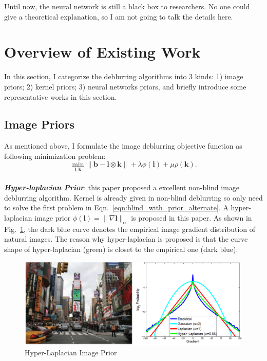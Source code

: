 \documentclass[journal, onecolumn, 10pt]{IEEEtran}
\begin{document}
Until now, the neural network is still a black box to researchers. No one could give a theoretical explanation, so I am not going to talk the details here.

\section{Overview of Existing Work}
In this section, I categorize the deblurring algorithms into $3$ kinds: 1) image priors; 2) kernel priors; 3) neural networks priors, and briefly introduce some representative works in this section.

\subsection{Image Priors}
\label{subsec:image_prior}
As mentioned above, I formulate the image deblurring objective function as following minimization problem:
\begin{equation}
\min_{\mathbf{l}, \mathbf{k}} \| \mathbf{b} - \mathbf{l} \otimes \mathbf{k} \| + \lambda\phi(\mathbf{l}) + \mu \rho(\mathbf{k}).
\label{eqn:objective_funtion}
\end{equation}
~\\
\textbf{\emph{Hyper-laplacian Prior}}\cite{krishnan2009fast}: this paper proposed a excellent non-blind image deblurring algorithm. Kernel is already given in non-blind deblurring so only need to solve the first problem in Eqn.~\ref{eqn:blind_with_prior_alternate}. A hyper-laplacian image prior $\phi(\mathbf{l}) = \|\nabla \mathbf{l}\|_{\alpha}$ is proposed in this paper. As shown in Fig.~\ref{fig:hyper_laplacian}, the dark blue curve denotes the empirical image gradient distribution of natural images. The reason why hyper-laplacian is proposed is that the curve shape of  hyper-laplacian (green) is closet to the empirical one (dark blue). 
\begin{figure}[h!]
\centering
\includegraphics[width = 1\textwidth]{pic/hyper_laplacian.png}
\caption{Hyper-Laplacian Image Prior\cite{su2016deep}}
\label{fig:hyper_laplacian}
\end{figure}
\end{document}
